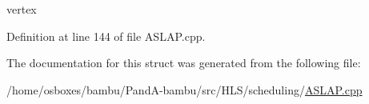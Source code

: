 vertex 



Definition at line 144 of file A\+S\+L\+A\+P.\+cpp.



The documentation for this struct was generated from the following file\+:\begin{DoxyCompactItemize}
\item 
/home/osboxes/bambu/\+Pand\+A-\/bambu/src/\+H\+L\+S/scheduling/\hyperlink{ASLAP_8cpp}{A\+S\+L\+A\+P.\+cpp}\end{DoxyCompactItemize}

